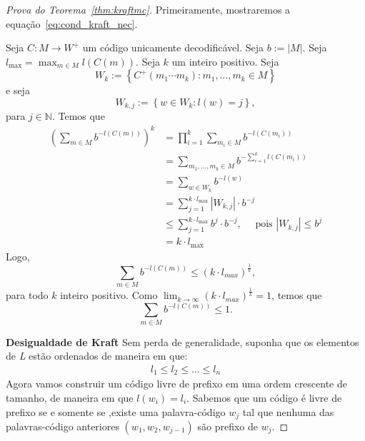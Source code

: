 \begin{proof}[Prova do Teorema~\ref{thm:kraftmc}]
    Primeiramente, mostraremos a equação~\eqref{eq:cond_kraft_nec}.
    
    Seja $C:M\to W^+$ um código unicamente decodificável. Seja $b :=
    |M|$. Seja $l_{\max} = \max_{m\in M} l(C(m))$. Seja $k$ um inteiro
    positivo. Seja
    \begin{equation*}
      W_k := \left\{ C^+(m_1\dotsm m_k):
      m_1,..., m_k \in M\right\}
    \end{equation*}
    e seja
    \begin{equation*}
      W_{k,j} := \left\{
      w \in W_k: l(w) = j
      \right\},
    \end{equation*}
    para $j\in \mathbb{N}$. Temos que
    \begin{align*}
      \left(\sum_{m\in M} b^{-l(C(m))}\right)^k
      &= \prod_{i=1}^k \sum_{m_i \in M} b^{-l(C(m_i))} \\
      &= \sum_{m_1,..., m_k \in M} b^{-\sum_{i=1}^{k} l(C(m_i))} \\
      &= \sum_{w\in W_k} b^{-l(w)}\\
      &= \sum_{j=1}^{k \cdot l_{\max}} |W_{k,j}| \cdot b^{-j}\\
      &\leq \sum_{j=1}^{k \cdot l_{\max}} b^j \cdot b^{-j},
      \quad\text{ pois }|W_{k,j}|\leq b^j\\
      & = k \cdot l_{\max}
    \end{align*}
Logo,
\begin{equation*}
\sum_{m\in M} b^{-l(C(m))} \leq (k \cdot l_{max})^ \frac{1}{k},
\end{equation*}
para todo $k$ inteiro positivo. Como $\lim_{k\to\infty} (k \cdot l_{max})^ \frac{1}{k} = 1$, temos que
\begin{equation*}
\sum_{m\in M} b^{-l(C(m))} \leq 1.
\end{equation*}

\textbf{Desigualdade de Kraft}
Sem perda de generalidade, suponha que os elementos de \emph{L} estão ordenados de maneira em que:
\begin{align*}
l_1 \leq l_2 \leq ... \leq l_n
\end{align*}
Agora vamos construir um código livre de prefixo em uma ordem crescente de tamanho, de maneira em que $l(w_i) = l_i$. Sabemos que um código é livre de prefixo se e somente se ,existe uma palavra-código $w_j$  tal que nenhuma das palavras-código anteriores $(w_1, w_2, w_{j-1})$ são prefixo de $w_j$.


\end{proof}
